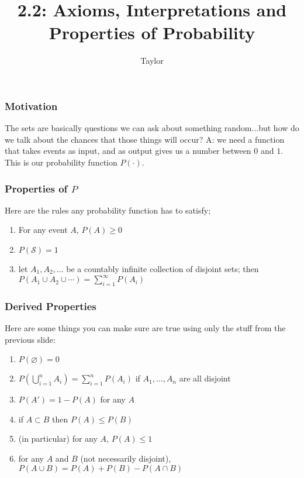 \documentclass{beamer}
\title["2.2"]{2.2: Axioms, Interpretations and Properties of Probability}
\author{Taylor}
\institute[UVA] 
{
University of Virginia \\
\medskip
\textit{} 
}
\date{}
\begin{document}

\begin{frame}
\titlepage 
\end{frame}

\begin{frame}
\frametitle{Motivation}

The sets are basically questions we can ask about something random...but how do we talk about the chances that those things will occur? A: we need a function that takes events as input, and as output gives us a number between $0$ and $1$. This is our probability function $P( \cdot ) $. 
\newline


\end{frame}


\begin{frame}
\frametitle{Properties of $P$}

Here are the rules any probability function has to satisfy;

\begin{enumerate}
\item For any event $A$, $P(A) \ge 0$
\item $P(\mathcal{S}) = 1$
\item let $A_1, A_2, \ldots$ be a countably infinite collection of disjoint sets; then $P(A_1 \cup A_2 \cup \cdots ) = \sum_{i=1}^{\infty}P(A_i)$
\end{enumerate}

\end{frame}



\begin{frame}
\frametitle{Derived Properties}

Here are some things you can make sure are true using only the stuff from the previous slide:
\newline

\begin{enumerate}
\item $P(\varnothing) = 0$
\item $P(\bigcup_{i=1}^n A_i) = \sum_{i=1}^n P(A_i)$ if $A_1, \ldots, A_n$ are all disjoint
\item $P(A') = 1-P(A)$ for any $A$
\item if $A \subset B$ then $P(A) \le P(B)$
\item (in particular) for any $A$, $P(A) \le 1$
\item for any $A$ and $B$ (not necessarily disjoint), $P(A \cup B) = P(A) + P(B) - P(A \cap B)$
\end{enumerate}


\end{frame}
\end{document}
